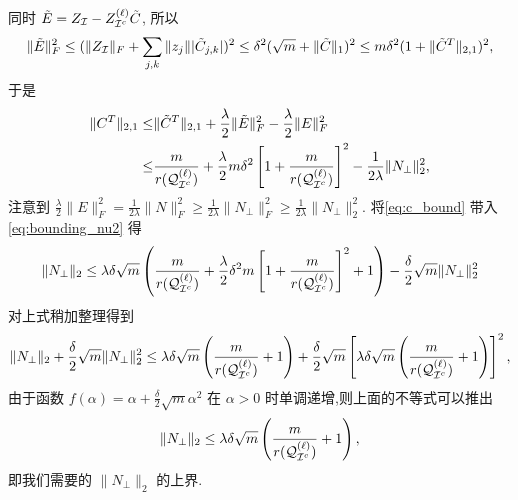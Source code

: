 同时 \(\tilde{E} = Z_{\mathcal{I}} - Z_{\mathcal{I}^c}^{(\ell)}\tilde{C}\), 所以 
\[\|\tilde{E}\|_F^2 \leq (\|Z_{\mathcal{I}}\|_F+\sum_{j,k} \|z_j\||\tilde{C}_{j,k}|)^2
\leq \delta^2 (\sqrt{m} + \|\tilde{C}\|_1)^2\leq m \delta^2(1+ \|\tilde{C}^T\|_{2,1})^2,\]
于是
\begin{align}
  \|C^T\|_{2,1} \leq& \|\tilde{C}^T\|_{2,1} +
  \frac{\lambda}{2}\|\tilde{E}\|_F^2-\frac{\lambda}{2}\|E\|_F^2\nonumber \\
  \leq& \frac{m}{r{(\mathcal{Q}_{\mathcal{I}^c}^{(\ell)})}}+\frac{\lambda}{2}m\delta^2
  \left[1+\frac{m}{r{(\mathcal{Q}_{\mathcal{I}^c}^{(\ell)})}}\right]^2-\frac{1}{2\lambda}\|N_{\perp}\|_2^2,
  \label{eq:c_bound}
\end{align}
注意到 \(\frac{\lambda}{2}\|E\|_F^2=\frac{1}{2\lambda}\|N\|_F^2
\geq\frac{1}{2\lambda}\|N_{\perp}\|_F^2 \geq\frac{1}{2\lambda}\|N_{\perp}\|_2^2\).
将\eqref{eq:c_bound} 带入\eqref{eq:bounding_nu2} 得
\[\|N_{\perp}\|_2 \leq \lambda \delta \sqrt{m} 
\left(\frac{m}{r(\mathcal{Q}_{\mathcal{I}^c}^{(\ell)})}+\frac{\lambda}{2}\delta^2m
\left[1+\frac{m}{r(\mathcal{Q}_{\mathcal{I}^c}^{(\ell)})}\right]^2+1\right)
-\frac{\delta}{2}\sqrt{m}\|N_{\perp}\|_2^2 \]
对上式稍加整理得到
\[\|N_{\perp}\|_2+\frac{\delta}{2}\sqrt{m}\|N_{\perp}\|_2^2\leq
  \lambda\delta\sqrt{m}\left(\frac{m}{r(\mathcal{Q}_{\mathcal{I}^c}^{(\ell)})}+1\right)+
  \frac{\delta}{2}\sqrt{m} \left[\lambda\delta\sqrt{m}
  \left(\frac{m}{r(\mathcal{Q}_{\mathcal{I}^c}^{(\ell)})}+1\right)\right]^2,\]
由于函数 \(f(\alpha)=\alpha+\frac{\delta}{2}\sqrt{m}\alpha^2\) 在 \(\alpha>0\)
时单调递增,则上面的不等式可以推出
\begin{equation}\label{eq:nu2_bound}
  \|N_{\perp}\|_2 \leq \lambda\delta\sqrt{m}\left(\frac{m}{r(\mathcal{Q}_{\mathcal{I}^c}^{(\ell)})}+1\right),
\end{equation}
即我们需要的 \(\|N_{\perp}\|_2\) 的上界.


